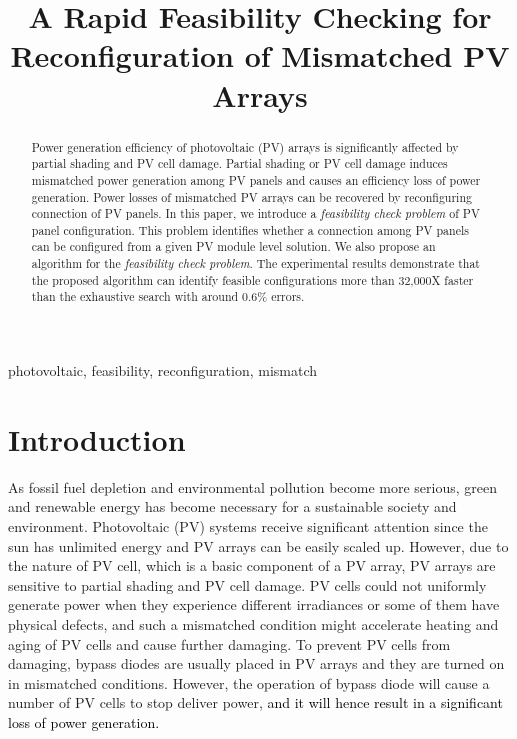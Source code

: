 \documentclass[conference]{pvsctran}
\newcommand{\michiko}{\textcolor{black}}
\begin{document}
\title{ A Rapid Feasibility Checking for Reconfiguration of Mismatched PV Arrays}

\author{ 
}

\setlength{\columnsep}{0.25in}


\maketitle


\begin{abstract}
  Power generation efficiency of photovoltaic (PV) arrays is significantly affected by partial shading and PV cell damage.
  Partial shading or PV cell damage induces mismatched power generation among PV panels and causes an efficiency loss of power generation.
  Power losses of mismatched PV arrays can be recovered by reconfiguring connection of PV panels.
  In this paper, we introduce a \textit{feasibility check problem} of PV panel configuration.
  This problem identifies whether a connection among PV panels can be configured from a given PV module level solution.
  We also propose an algorithm for the \textit{feasibility check problem}.
  The experimental results demonstrate that the proposed algorithm can identify feasible configurations more than 32,000X faster than the exhaustive search with around 0.6\% errors. 
\end{abstract}

\begin{IEEEkeywords}
photovoltaic, feasibility, reconfiguration, mismatch
\end{IEEEkeywords}

\IEEEpeerreviewmaketitle



\section{Introduction}\label{Sec1}
As fossil fuel depletion and environmental pollution become more serious, green and renewable energy has become necessary for a sustainable society and environment. 
Photovoltaic (PV) systems receive significant attention since the sun has unlimited energy and PV arrays can be easily scaled up. 
However, due to the nature of PV cell, which is a basic component of a PV array, PV arrays are sensitive to partial shading and PV cell damage. 
PV cells could not uniformly generate power when they experience different irradiances or some of them have physical defects, and such a mismatched condition might accelerate heating and aging of PV cells and cause further damaging.
To prevent PV cells from damaging, bypass diodes are usually placed in PV arrays and they are turned on in mismatched conditions.
However, the operation of bypass diode will cause a number of PV cells to stop deliver power,
\michiko{and it will hence result in a significant loss of power generation.}
\end{document}
